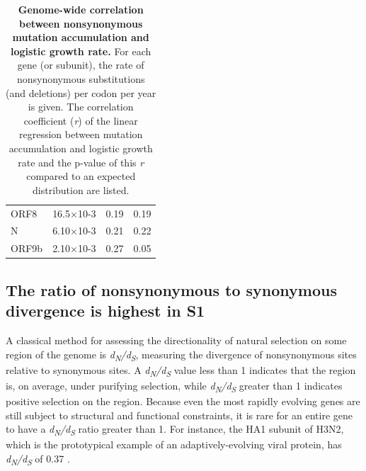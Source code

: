 \documentclass[12pt, letterpaper]{article}
\begin{document}
\begin{table}[]
\begin{center}
\begin{tabular}{@{}llll@{}}
    ORF8  & 16.5×10-3 & 0.19  & 0.19             \\
    N     & 6.10×10-3 & 0.21  & 0.22             \\
    ORF9b & 2.10×10-3 & 0.27  & 0.05             \\ \bottomrule
    \end{tabular}
    \caption{\textbf{Genome-wide correlation between nonsynonymous mutation accumulation and logistic growth rate.} For each gene (or subunit), the rate of nonsynonymous substitutions (and deletions) per codon per year is given. The correlation coefficient (\emph{r}) of the linear regression between mutation accumulation and logistic growth rate and the p-value of this \emph{r} compared to an expected distribution are listed.}
    \label{tab:table1}
    \end{center}
\end{table}

\subsection*{The ratio of nonsynonymous to synonymous divergence is highest in S1}
A classical method for assessing the directionality of natural selection on some region of the genome is \emph{d\textsubscript{N}/d\textsubscript{S}}, measuring the divergence of nonsynonymous sites relative to synonymous sites. A \emph{d\textsubscript{N}/d\textsubscript{S}} value less than 1 indicates that the region is, on average, under purifying selection, while \emph{d\textsubscript{N}/d\textsubscript{S}} greater than 1 indicates positive selection on the region. Because even the most rapidly evolving genes are still subject to structural and functional constraints, it is rare for an entire gene to have a \emph{d\textsubscript{N}/d\textsubscript{S}} ratio greater than 1. For instance, the HA1 subunit of H3N2, which is the prototypical example of an adaptively-evolving viral protein, has \emph{d\textsubscript{N}/d\textsubscript{S}} of 0.37 \citep{Wolf2006-vy}.
\end{document}
